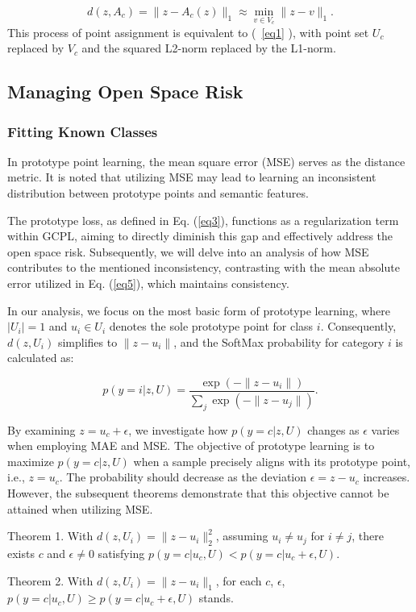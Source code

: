 \documentclass{gji}
\begin{document}
\[
d(z, A_c) = \|z - A_c(z)\|_{1} \approx \min_{v \in V_c} \|z - v\|_{1}. \tag{7} \label{eq7} 
\]
This process of point assignment is equivalent to (~\ref{eq1} ), with point set $U_c$ replaced by $V_c$ and the squared L2-norm replaced by the L1-norm.

\subsection{Managing Open Space Risk}
\subsubsection{Fitting Known Classes} \label{section4} 
In prototype point learning, the mean square error (MSE) serves as the distance metric. It is noted that utilizing MSE may lead to learning an inconsistent distribution between prototype points and semantic features.

The prototype loss, as defined in Eq. (\ref{eq3}), functions as a regularization term within GCPL, aiming to directly diminish this gap and effectively address the open space risk. Subsequently, we will delve into an analysis of how MSE contributes to the mentioned inconsistency, contrasting with the mean absolute error utilized in Eq. (\ref{eq5}), which maintains consistency.

In our analysis, we focus on the most basic form of prototype learning, where $|U_i| = 1$ and $u_i \in U_i$ denotes the sole prototype point for class $i$. Consequently, $d(z, U_i)$ simplifies to $\|z - u_i\|$, and the SoftMax probability for category $i$ is calculated as:

\[
p(y = i|z, U) = \frac{\exp(-\|z - u_i\|)}{\sum_{j} \exp(-\|z - u_j\|)}. \tag{8} \label{eq8} 
\]

By examining $z = u_c + \epsilon$, we investigate how $p(y = c|z, U)$ changes as $\epsilon$ varies when employing MAE and MSE. The objective of prototype learning is to maximize $p(y = c|z, U)$ when a sample precisely aligns with its prototype point, i.e., $z = u_c$. The probability should decrease as the deviation $\epsilon = z - u_c$ increases. However, the subsequent theorems demonstrate that this objective cannot be attained when utilizing MSE.

Theorem 1. With $d(z, U_i) = \|z - u_i\|_2^2$, assuming $u_i \neq u_j$ for $i \neq j$, there exists $c$ and $\epsilon \neq 0$ satisfying $p(y = c|u_c, U) < p(y = c|u_c + \epsilon, U)$.

Theorem 2. With $d(z, U_i) = \|z - u_i\|_1$, for each $c$, $\epsilon$, $p(y = c|u_c, U) \geq p(y = c|u_c + \epsilon, U)$ stands.
\end{document}
